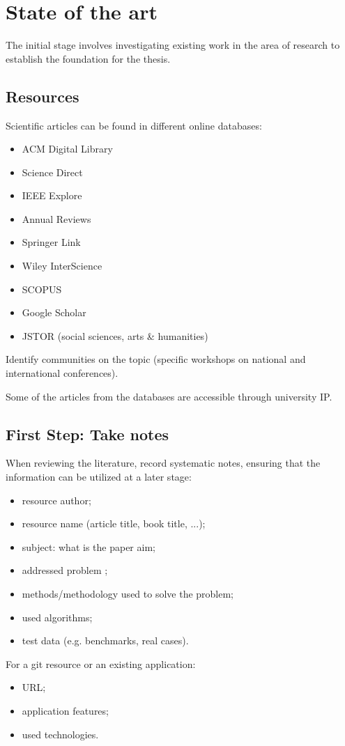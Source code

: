 
\chapter{State of the art}\label{chapter:chap2}

The initial stage involves investigating existing work in the area of research to establish the foundation for the thesis.

\section{Resources}

Scientific articles can be found in different online databases:
\begin{itemize}
    \item ACM Digital Library
    \item Science Direct
     \item IEEE Explore
    \item Annual Reviews
    \item Springer Link
    \item Wiley InterScience
    \item SCOPUS
    \item  Google Scholar
     \item JSTOR (social sciences, arts \& humanities)
\end{itemize}

Identify communities on the topic (specific workshops on national and international conferences).

Some of the articles from the databases are accessible through university IP.


\section{First Step: Take notes}

When reviewing the literature, record systematic notes, ensuring that the information can be utilized at a later stage:
\begin{itemize}
    \item resource author;
    \item resource name (article title, book title, ...);
    \item subject: what is the paper aim;
    \item addressed problem ; 
    \item methods/methodology used to solve the problem;
    \item used algorithms;
    \item test data (e.g. benchmarks, real cases).
\end{itemize}

For a git resource or an existing application:
\begin{itemize}
    \item URL;
    \item application features;
    \item used technologies.
\end{itemize}